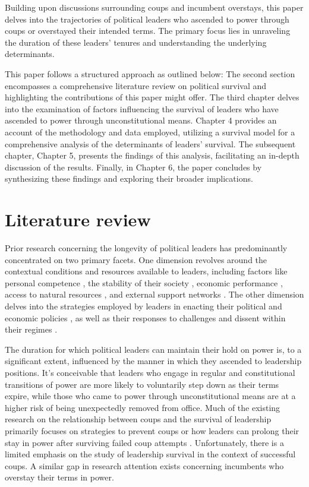 \documentclass[
  12pt,
  a4paper,
  12pt]{article}
\begin{document}
Building upon discussions surrounding coups and incumbent overstays,
this paper delves into the trajectories of political leaders who
ascended to power through coups or overstayed their intended terms. The
primary focus lies in unraveling the duration of these leaders' tenures
and understanding the underlying determinants.

This paper follows a structured approach as outlined below: The second
section encompasses a comprehensive literature review on political
survival and highlighting the contributions of this paper might offer.
The third chapter delves into the examination of factors influencing the
survival of leaders who have ascended to power through unconstitutional
means. Chapter 4 provides an account of the methodology and data
employed, utilizing a survival model for a comprehensive analysis of the
determinants of leaders' survival. The subsequent chapter, Chapter 5,
presents the findings of this analysis, facilitating an in-depth
discussion of the results. Finally, in Chapter 6, the paper concludes by
synthesizing these findings and exploring their broader implications.

\hypertarget{literature-review}{%
\section{Literature review}\label{literature-review}}

Prior research concerning the longevity of political leaders has
predominantly concentrated on two primary facets. One dimension revolves
around the contextual conditions and resources available to leaders,
including factors like personal competence \citep{yu2016}, the stability
of their society \citep{arriola2009}, economic performance
\citep[\citet{williams2011}]{palmer1999}, access to natural resources
\citep{smith2004, quirozflores2012}, and external support networks
\citep[\citet{thyne2017}]{licht2009, wright2008}. The other dimension
delves into the strategies employed by leaders in enacting their
political and economic policies \citep{gandhi2007, morrison2009}, as
well as their responses to challenges and dissent within their regimes
\citep{escribà-folch2013, davenport2021}.

The duration for which political leaders can maintain their hold on
power is, to a significant extent, influenced by the manner in which
they ascended to leadership positions. It's conceivable that leaders who
engage in regular and constitutional transitions of power are more
likely to voluntarily step down as their terms expire, while those who
came to power through unconstitutional means are at a higher risk of
being unexpectedly removed from office. Much of the existing research on
the relationship between coups and the survival of leadership primarily
focuses on strategies to prevent coups
\citep{powell2017, sudduth2017, debruin2020} or how leaders can prolong
their stay in power after surviving failed coup attempts
\citep{easton2018}. Unfortunately, there is a limited emphasis on the
study of leadership survival in the context of successful coups. A
similar gap in research attention exists concerning incumbents who
overstay their terms in power.
\end{document}
